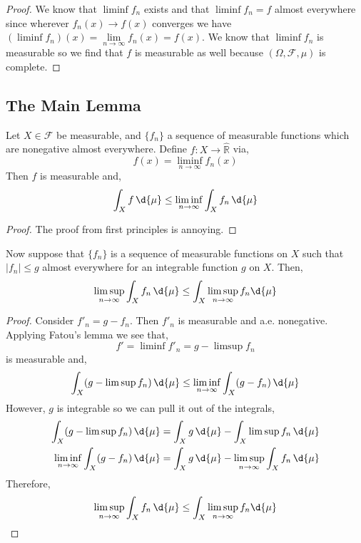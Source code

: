 \documentclass[12pt]{article}
\newcommand{\R}{\mathbb{R}}
\renewcommand{\F}{\mathcal{F}}
\begin{document}
\begin{proof}
We know that $\liminf f_n$ exists and that $\liminf f_n = f$ almost everywhere since wherever $f_n(x) \to f(x)$ converges we have $(\liminf f_n)(x) = \lim\limits_{n \to \infty} f_n(x) = f(x)$. We know that $\liminf f_n$ is measurable so we find that $f$ is measurable as well because $(\Omega, \F, \mu)$ is complete.
\end{proof}

\subsection{The Main Lemma}

\begin{lemma}[Fatou]
Let $X \in \F$ be measurable, and $\{ f_n \}$ a sequence of measurable functions which are nonegative almost everywhere. Define $f : X \to \hat{\R}$ via,
\[ f(x) = \liminf_{n \to \infty} f_n(x) \]
Then $f$ is measurable and,
\[ \int_X f \, \d{\mu} \le \liminf_{n \to \infty} \int_X f_n \, \d{\mu} \]
\end{lemma}

\begin{proof}
The proof from first principles is annoying.
\end{proof}

\begin{cor}
Now suppose that $\{ f_n \}$ is a sequence of measurable functions on $X$ such that $|f_n| \le g$ almost everywhere for an integrable function $g$ on $X$. Then,
\[ \limsup_{n \to \infty} \int_X f_n \, \d{\mu} \le \int_X \limsup_{n \to \infty} f_n \d{\mu} \]
\end{cor}

\begin{proof}
Consider $f'_n = g - f_n$. Then $f'_n$ is measurable and a.e. nonegative. Applying Fatou's lemma we see that,
\[ f' = \liminf f'_n = g - \limsup f_n \]
is measurable and,
\[ \int_X (g - \limsup f_n) \, \d{\mu} \le \liminf_{n \to \infty} \int_X (g - f_n) \, \d{\mu}  \]
However, $g$ is integrable so we can pull it out of the integrals,
\begin{align*}
\int_X (g - \limsup f_n) \, \d{\mu} & = \int_X g \, \d{\mu} - \int_X \limsup f_n \, \d{\mu} 
\\
\liminf_{n \to \infty} \int_X (g - f_n) \, \d{\mu} & = \int_X g \, \d{\mu} - \limsup_{n \to \infty} \int_X f_n \, \d{\mu}
\end{align*}
Therefore,
\[ \limsup_{n \to \infty} \int_X f_n \, \d{\mu} \le \int_X \limsup_{n \to \infty} f_n \d{\mu} \]
\end{proof}
\end{document}

